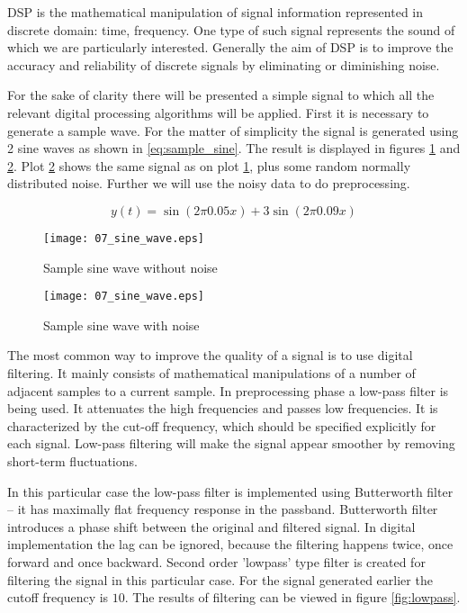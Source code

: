 DSP is the mathematical manipulation of signal information represented in discrete domain: time, frequency. One type of such signal represents the sound of which we are particularly interested. Generally the aim of DSP is to improve the accuracy and reliability of discrete signals by eliminating or diminishing noise.

For the sake of clarity there will be presented a simple signal to which all the relevant digital processing algorithms will be applied. First it is necessary to generate a sample wave. For the matter of simplicity the signal is generated using 2 sine waves as shown in \eqref{eq:sample_sine}. The result is displayed in figures \ref{fig:sines1} and \ref{fig:sines2}. Plot \ref{fig:sines2} shows the same signal as on plot \ref{fig:sines1}, plus some random normally distributed noise. Further we will use the noisy data to do preprocessing.

\begin{equation} \label{eq:sample_sine}
 y(t) = \sin(2\pi 0.05 x) + 3\sin(2\pi 0.09 x)
\end{equation}


\begin{figure}[!ht]
\centering
  \texttt{[image: 07\_sine\_wave.eps]}
\caption{Sample sine wave without noise}
\label{fig:sines1}
\end{figure}

\begin{figure}[!ht]
\centering
  \texttt{[image: 07\_sine\_wave.eps]}
\caption{Sample sine wave with noise}
\label{fig:sines2}
\end{figure}

The most common way to improve the quality of a signal is to use digital filtering. It mainly consists of mathematical manipulations of a number of adjacent samples to a current sample. In preprocessing phase a low-pass filter is being used. It attenuates the high frequencies and passes low frequencies. It is characterized by the cut-off frequency, which should be specified explicitly for each signal. Low-pass filtering will make the signal appear smoother by removing short-term fluctuations. 

In this particular case the low-pass filter is implemented using Butterworth filter -- it has maximally flat frequency response in the passband. Butterworth filter introduces a phase shift between the original and filtered signal. In digital implementation the lag can be ignored, because the filtering happens twice, once forward and once backward. Second order 'lowpass' type filter is created for filtering the signal in this particular case. For the signal generated earlier the cutoff frequency is $10$. The results of filtering can be viewed in figure \ref{fig:lowpass}.

